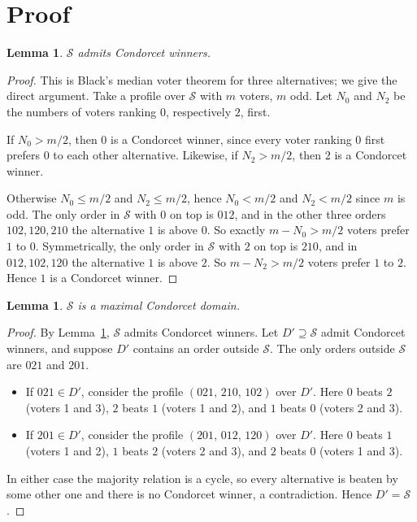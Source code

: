 \documentclass[11pt]{article}
\theoremstyle{plain}
\newtheorem{lemma}[theorem]{Lemma}
\theoremstyle{definition}
\theoremstyle{remark}
\newcommand{\SP}{\mathcal S}
\begin{document}
\section{Proof}

\begin{lemma}\label{lem:black}
$\SP$ admits Condorcet winners.
\end{lemma}

\begin{proof}
This is Black's median voter theorem for three alternatives; we give the direct
argument. Take a profile over $\SP$ with $m$ voters, $m$ odd. Let $N_0$ and $N_2$
be the numbers of voters ranking $0$, respectively $2$, first.

If $N_0>m/2$, then $0$ is a Condorcet winner, since every voter ranking $0$ first
prefers $0$ to each other alternative. Likewise, if $N_2>m/2$, then $2$ is a
Condorcet winner.

Otherwise $N_0\le m/2$ and $N_2\le m/2$, hence $N_0<m/2$ and $N_2<m/2$ since $m$ is
odd. The only order in $\SP$ with $0$ on top is $012$, and in the other three orders
$102,120,210$ the alternative $1$ is above $0$. So exactly $m-N_0>m/2$ voters prefer
$1$ to $0$. Symmetrically, the only order in $\SP$ with $2$ on top is $210$, and in
$012,102,120$ the alternative $1$ is above $2$. So $m-N_2>m/2$ voters prefer $1$ to
$2$. Hence $1$ is a Condorcet winner.
\end{proof}

\begin{lemma}\label{lem:max}
$\SP$ is a maximal Condorcet domain.
\end{lemma}

\begin{proof}
By Lemma~\ref{lem:black}, $\SP$ admits Condorcet winners. Let $D'\supseteq\SP$
admit Condorcet winners, and suppose $D'$ contains an order outside $\SP$. The only
orders outside $\SP$ are $021$ and $201$.
\begin{itemize}
\item If $021\in D'$, consider the profile $(021,\,210,\,102)$ over $D'$. Here $0$
  beats $2$ (voters 1 and 3), $2$ beats $1$ (voters 1 and 2), and $1$ beats $0$
  (voters 2 and 3).
\item If $201\in D'$, consider the profile $(201,\,012,\,120)$ over $D'$. Here $0$
  beats $1$ (voters 1 and 2), $1$ beats $2$ (voters 2 and 3), and $2$ beats $0$
  (voters 1 and 3).
\end{itemize}
In either case the majority relation is a cycle, so every alternative is beaten by
some other one and there is no Condorcet winner, a contradiction. Hence $D'=\SP$.
\end{proof}
\end{document}
